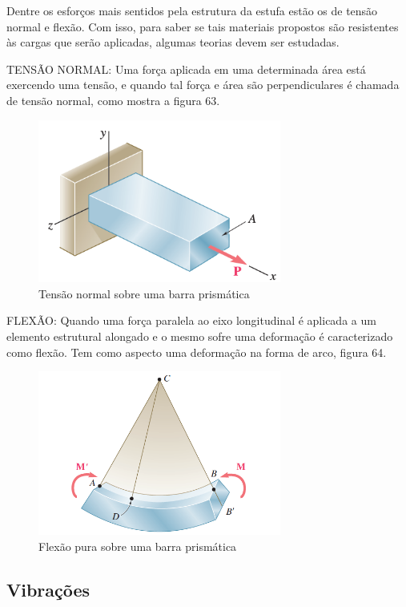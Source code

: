 Dentre os esforços mais sentidos pela estrutura da estufa estão os de tensão normal e flexão. Com isso, para saber se tais materiais propostos são resistentes às cargas que serão aplicadas, algumas teorias devem ser estudadas.

TENSÃO NORMAL: Uma força aplicada em uma determinada área está exercendo uma tensão, e quando tal força e área são perpendiculares é chamada de tensão normal, como mostra a figura 63. 

\begin{figure}[H]
	\centering
	\includegraphics[width=8cm]{figuras/tensao_normal.png}
	\caption{Tensão normal sobre uma barra prismática} \label{tensao_normal}
\end{figure}

FLEXÃO: Quando uma força paralela ao eixo longitudinal é aplicada a um elemento estrutural alongado e o mesmo sofre uma deformação é caracterizado como flexão. Tem como aspecto uma deformação na forma de arco, figura 64.

\begin{figure}[H]
	\centering
	\includegraphics[width=8cm]{figuras/flexao_pura.png}
	\caption{Flexão pura sobre uma barra prismática} \label{flexao_pura}
\end{figure}

\subsection{Vibrações}


